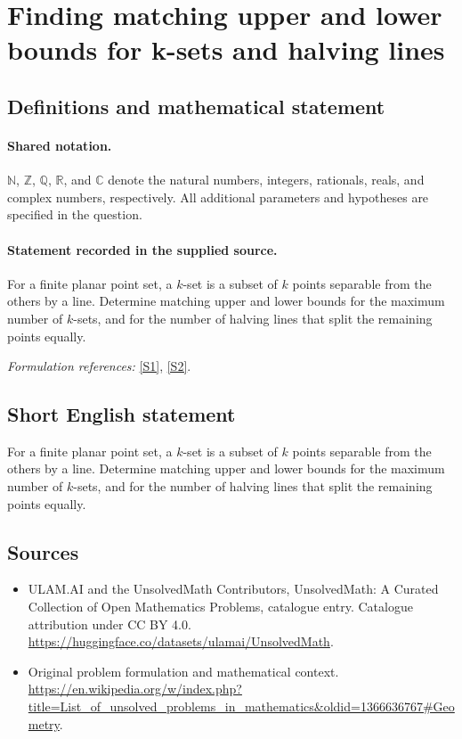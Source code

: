 \documentclass[11pt]{article}
\newcommand{\sref}[2]{\hyperlink{source:#1:#2}{[S#2]}}
\begin{document}
\section{Finding matching upper and lower bounds for k-sets and halving lines}\label{statement}

\subsection{Definitions and mathematical statement}

\paragraph{Shared notation.}$\mathbb N$, $\mathbb Z$, $\mathbb Q$, $\mathbb R$, and $\mathbb C$ denote the natural numbers, integers, rationals, reals, and complex numbers, respectively. All additional parameters and hypotheses are specified in the question.


\paragraph{Statement recorded in the supplied source.}
For a finite planar point set, a $k$-set is a subset of $k$ points separable from the others by a line. Determine matching upper and lower bounds for the maximum number of $k$-sets, and for the number of halving lines that split the remaining points equally.
\par\smallskip\textit{Formulation references:} \sref{statement}{1}, \sref{statement}{2}.
\subsection{Short English statement}
For a finite planar point set, a $k$-set is a subset of $k$ points separable from the others by a line. Determine matching upper and lower bounds for the maximum number of $k$-sets, and for the number of halving lines that split the remaining points equally.
\subsection{Sources}
\begin{itemize}
\item[\hypertarget{source:statement:1}{S1}] ULAM.AI and the UnsolvedMath Contributors, UnsolvedMath: A Curated Collection of Open Mathematics Problems, catalogue entry. Catalogue attribution under CC BY 4.0.
\url{https://huggingface.co/datasets/ulamai/UnsolvedMath}.
\item[\hypertarget{source:statement:2}{S2}] Original problem formulation and mathematical context.
\url{https://en.wikipedia.org/w/index.php?title=List_of_unsolved_problems_in_mathematics&oldid=1366636767#Geometry}.
\end{itemize}
\label{end:statement}
\end{document}
